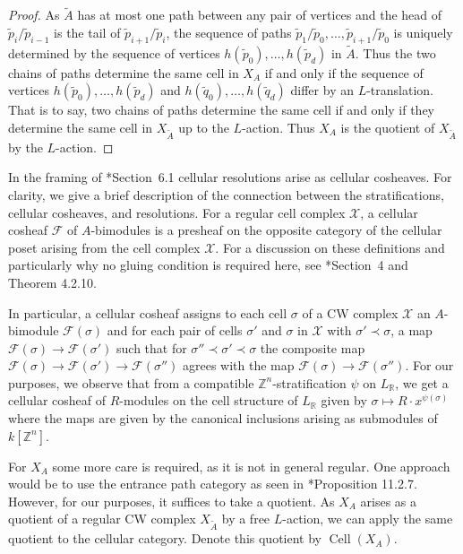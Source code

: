 \documentclass{amsart}
\newcommand{\ZZ}{\mathbb{Z}}
\newcommand{\RR}{\mathbb{R}}
\newcommand{\field}{k}
\DeclareMathOperator{\Cell}{Cell}
\theoremstyle{remark}
\begin{document}
\begin{proof}
  As $\widetilde{A}$ has at most one path between any pair of vertices and the head of $\widetilde{p}_{i}/\widetilde{p}_{i-1}$ is the tail of $\widetilde{p}_{i+1}/\widetilde{p}_i$, the sequence of paths $\widetilde{p}_{1}/\widetilde{p}_0,\ldots,\widetilde{p}_{i+1}/\widetilde{p}_{0}$ is uniquely determined by the sequence of vertices $h(\widetilde{p}_0),\ldots,h(\widetilde{p}_d)$ in $\widetilde{A}$. Thus the two chains of paths determine the same cell in $X_A$ if and only if the sequence of vertices $h(\widetilde{p}_0),\ldots,h(\widetilde{p}_d)$ and $h(\widetilde{q}_0),\ldots,h(\widetilde{q}_d)$ differ by an $L$-translation. That is to say, two chains of paths determine the same cell if and only if they determine the same cell in $X_{\widetilde{A}}$ up to the $L$-action. Thus $X_A$ is the quotient of $X_{\widetilde{A}}$ by the $L$-action.
\end{proof}

In the framing of \cite{FH25}*{Section~6.1} cellular resolutions arise as cellular cosheaves. For clarity, we give a brief description of the connection between the stratifications, cellular cosheaves, and resolutions. For a regular cell complex $\mathcal{X}$, a cellular cosheaf $\mathcal{F}$ of $A$-bimodules is a presheaf on the opposite category of the cellular poset arising from the cell complex $\mathcal{X}$. For a discussion on these definitions and particularly why no gluing condition is required here, see \cite{Curry}*{Section~4 and Theorem 4.2.10}.

In particular, a cellular cosheaf assigns to each cell $\sigma$ of a CW complex $\mathcal{X}$ an $A$-bimodule $\mathcal{F}(\sigma)$ and for each pair of cells $\sigma'$ and $\sigma$ in $\mathcal{X}$ with $\sigma'\prec \sigma$, a map $\mathcal{F}(\sigma)\rightarrow \mathcal{F}(\sigma')$ such that for $\sigma''\prec \sigma'\prec \sigma$ the composite map $\mathcal{F}(\sigma)\rightarrow \mathcal{F}(\sigma')\rightarrow \mathcal{F}(\sigma'')$ agrees with the map $\mathcal{F}(\sigma)\rightarrow \mathcal{F}(\sigma'')$.
For our purposes, we observe that from a compatible $\ZZ^n$-stratification $\psi$ on $L_{\RR}$, we get a cellular cosheaf of $R$-modules on the cell structure of $L_{\RR}$ given by $\sigma \mapsto R\cdot x^{\psi(\sigma)}$ where the maps are given by the canonical inclusions arising as submodules of $\field[\ZZ^n]$.

For $X_{A}$ some more care is required, as it is not in general regular. One approach would be to use the entrance path category as seen in \cite{Curry}*{Proposition 11.2.7}.
However, for our purposes, it suffices to take a quotient.
As $X_A$ arises as a quotient of a regular CW complex $X_{\widetilde{A}}$ by a free $L$-action, we can apply the same quotient to the cellular category. Denote this quotient by $\Cell(X_{A})$.
\end{document}
